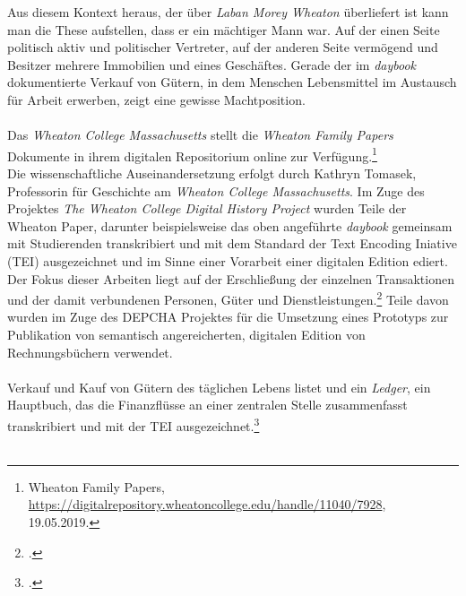 \documentclass[12pt,a4paper]{article}
\begin{document}
Aus diesem Kontext heraus, der über \textit{Laban Morey Wheaton} überliefert ist kann man die These aufstellen, dass er ein mächtiger Mann war. Auf der einen Seite politisch aktiv und politischer Vertreter, auf der anderen Seite vermögend und Besitzer mehrere Immobilien und eines Geschäftes. Gerade der im \textit{daybook} dokumentierte Verkauf von Gütern, in dem Menschen Lebensmittel im Austausch für Arbeit erwerben, zeigt eine gewisse Machtposition.
\\
\\
Das \textit{Wheaton College Massachusetts} stellt die \textit{Wheaton Family Papers} Dokumente in ihrem digitalen Repositorium online zur Verfügung.\footnote{Wheaton Family Papers, \url{https://digitalrepository.wheatoncollege.edu/handle/11040/7928}, 19.05.2019.} 
\\
Die wissenschaftliche Auseinandersetzung erfolgt durch Kathryn Tomasek, Professorin für Geschichte am \textit{Wheaton College Massachusetts}. Im Zuge des Projektes \textit{The Wheaton College Digital History Project} wurden Teile der Wheaton Paper, darunter beispielsweise das oben angeführte \textit{daybook} gemeinsam mit Studierenden transkribiert und mit dem Standard der Text Encoding Iniative (TEI) ausgezeichnet und im Sinne einer Vorarbeit einer digitalen Edition ediert. Der Fokus dieser Arbeiten liegt auf der Erschließung der einzelnen Transaktionen und der damit verbundenen Personen, Güter und Dienstleistungen.\footcite[Vgl. TOMASEK Kathryn: The Wheaton College Digital History Project: Undergraduate Research in a Local Collection, \protect\url{https://writinghistory.trincoll.edu/teach/wheaton-college-digital-history-project-tomasek/}, 23.05.2019.][S.379]{alexander2012should} Teile davon wurden im Zuge des DEPCHA Projektes für die Umsetzung eines Prototyps zur Publikation von semantisch angereicherten, digitalen Edition von Rechnungsbüchern verwendet.
\\
\\
Verkauf und Kauf von Gütern des täglichen Lebens listet und ein \textit{Ledger}, ein Hauptbuch, das die Finanzflüsse an einer zentralen Stelle zusammenfasst transkribiert und mit der TEI ausgezeichnet.\footcite[][]{tomasek2013encoding}
\\
\\
\end{document}
